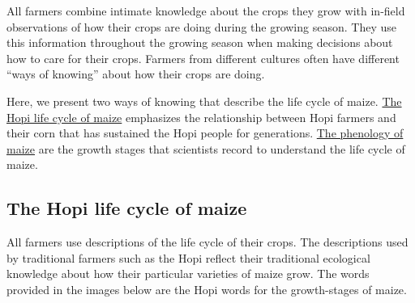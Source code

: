 \documentclass[12pt,]{article}
\begin{document}
All farmers combine intimate knowledge about the crops they grow with in-field observations of how their crops are doing during the growing season. They use this information throughout the growing season when making decisions about how to care for their crops. Farmers from different cultures often have different ``ways of knowing'' about how their crops are doing.

Here, we present two ways of knowing that describe the life cycle of maize. \protect\hyperlink{the-hopi-life-cycle-of-maize}{The Hopi life cycle of maize} emphasizes the relationship between Hopi farmers and their corn that has sustained the Hopi people for generations. \protect\hyperlink{the-phenology-of-maize}{The phenology of maize} are the growth stages that scientists record to understand the life cycle of maize.

\hypertarget{the-hopi-life-cycle-of-maize}{%
\subsection{The Hopi life cycle of maize}\label{the-hopi-life-cycle-of-maize}}

All farmers use descriptions of the life cycle of their crops. The descriptions used by traditional farmers such as the Hopi reflect their traditional ecological knowledge about how their particular varieties of maize grow. The words provided in the images below are the Hopi words for the growth-stages of maize.
\end{document}
